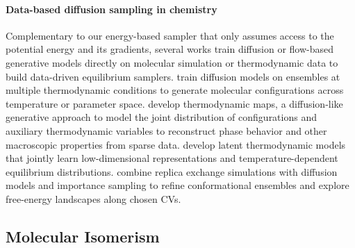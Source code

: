 \documentclass[]{fairmeta}
\theoremstyle{remark}
\begin{document}
\paragraph{Data-based diffusion sampling in chemistry}
Complementary to our energy-based sampler that only assumes access to the potential energy and its gradients, several works train diffusion or flow-based generative models directly on molecular simulation or thermodynamic data to build data-driven equilibrium samplers.
\citet{wang2022data} train diffusion models on ensembles at multiple thermodynamic conditions to generate molecular configurations across temperature or parameter space.
\citet{herron2024inferring} develop thermodynamic maps, a diffusion-like generative approach to model the joint distribution of configurations and auxiliary thermodynamic variables to reconstruct phase behavior and other macroscopic properties from sparse data.
\citet{qiu2025latent} develop latent thermodynamic models that jointly learn low-dimensional representations and temperature-dependent equilibrium distributions.
\citet{benayad2025hamiltonian} combine replica exchange simulations with diffusion models and importance sampling to refine conformational ensembles and explore free-energy landscapes along chosen CVs.


\subsection{Molecular Isomerism}
\label{sec:isomerism}
\end{document}
